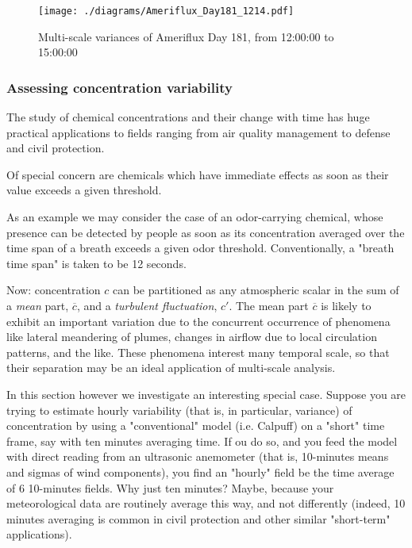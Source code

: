 \documentclass[a4paper,10pt]{book}
\begin{document}
\begin{figure}[htp]
 \centering
 \begin{center}
 \texttt{[image: ./diagrams/Ameriflux\_Day181\_1214.pdf]}
 \end{center}
 \caption{Multi-scale variances of Ameriflux Day 181, from 12:00:00 to 15:00:00}
 \label{fig:Ame.181.Day}
\end{figure}


\subsubsection{Assessing concentration variability}

The study of chemical concentrations and their change with time has huge practical applications to fields ranging from air quality management to defense and civil protection.

Of special concern are chemicals which have immediate effects as soon as their value exceeds a given threshold.

As an example we may consider the case of an odor-carrying chemical, whose presence can be detected by people as soon as its concentration averaged over the time span of a breath exceeds a given odor threshold. Conventionally, a "breath time span" is taken to be 12 seconds.

Now: concentration $c$ can be partitioned as any atmospheric scalar in the sum of a \emph{mean} part, $\overline{c}$, and a \emph{turbulent fluctuation}, $c'$. The mean part $\overline{c}$ is likely to exhibit an important variation due to the concurrent occurrence of phenomena like lateral meandering of plumes, changes in airflow due to local circulation patterns, and the like. These phenomena interest many temporal scale, so that their separation may be an ideal application of multi-scale analysis.

In this section however we investigate an interesting special case. Suppose you are trying to estimate hourly variability (that is, in particular, variance) of concentration by using a "conventional" model (i.e. Calpuff) on a "short" time frame, say with ten minutes averaging time. If ou do so, and you feed the model with direct reading from an ultrasonic anemometer (that is, 10-minutes means and sigmas of wind components), you find an "hourly" field be the time average of 6 10-minutes fields. Why just ten minutes? Maybe, because your meteorological data are routinely average this way, and not differently (indeed, 10 minutes averaging is common in civil protection and other similar "short-term" applications).
\end{document}
